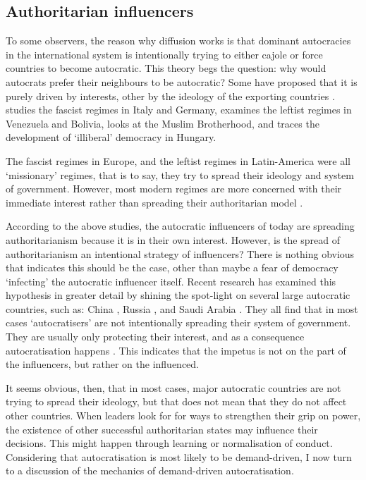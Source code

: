 \subsection{Authoritarian influencers}
To some observers, the reason why diffusion works is that dominant autocracies in the international system is intentionally trying to either cajole or force countries to become autocratic. This theory begs the question: why would autocrats prefer their neighbours to be autocratic? Some have proposed that it is purely driven by interests, other by the ideology of the exporting countries \citep{weyland_autocratic_2017}.  \citet{weyland_fascisms_2017} studies the fascist regimes in Italy and Germany, \citet{de_la_torre_hugo_2017} examines the leftist regimes in Venezuela and Bolivia, \citet{darwich_creating_2017} looks at the Muslim Brotherhood, and \citet{buzogany_illiberal_2017} traces the development of `illiberal' democracy in Hungary. 

The fascist regimes in Europe, and the leftist regimes in Latin-America were all `missionary' regimes, that is to say, they try to spread their ideology and system of government. However, most modern regimes are more concerned with their immediate interest rather than spreading their authoritarian model \citep{bank_study_2017, brownlee_limited_2017}. 

According to the above studies, the autocratic influencers of today are spreading authoritarianism because it is in their own interest. However, is the spread of authoritarianism an intentional strategy of influencers? There is nothing obvious that indicates this should be the case, other than maybe a fear of democracy `infecting' the autocratic influencer itself. Recent research has examined this hypothesis in greater detail by shining the spot-light on several large autocratic countries, such as: China \citep{chen_democracy_2015, hackenesch_not_2015}, Russia \citep{babayan_return_2015, delcour_spoiler_2015}, and Saudi Arabia \citep{freyburg_local_2015, hassan_undermining_2015}.  They all find that in most cases `autocratisers' are not intentionally spreading their system of government. They are usually only protecting their interest, and as a consequence autocratisation happens \citep{risse_democracy_2015, borzel_noble_2015}. This indicates that the impetus is not on the part of the influencers, but rather on the influenced. 

It seems obvious, then, that in most cases, major autocratic countries are not trying to spread their ideology, but that does not mean that they do not affect other countries. When leaders look for for ways to strengthen their grip on power, the existence of other successful authoritarian states may influence their decisions. This might happen through learning or normalisation of conduct. Considering that autocratisation is most likely to be demand-driven, I now turn to a discussion of the mechanics of demand-driven autocratisation.

